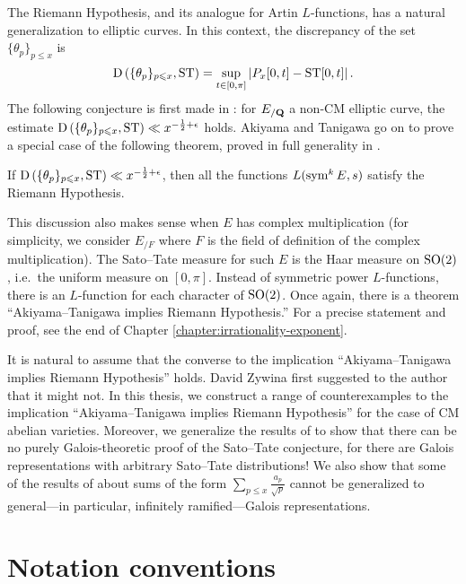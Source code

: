 The Riemann Hypothesis, and its analogue for Artin $L$-functions, has a natural 
generalization to elliptic curves. In this context, the discrepancy of the set 
$\{\theta_p\}_{p\leqslant x}$ is 
\[
	\operatorname{D}\left(\{\theta_p\}_{p\leqslant x},\mathrm{ST}\right) = \sup_{t\in [0,\pi]} \left| P_x[0,t] - \mathrm{ST}[0,t]\right| .
\]
The following conjecture is first made in \cite{akiyama-tanigawa-1999}: for 
$E_{/\mathbf{Q}}$ a non-CM elliptic curve, the estimate 
$\operatorname{D}\left(\{\theta_p\}_{p\leqslant x},\mathrm{ST}\right)\ll x^{-\frac 1 2+\epsilon}$ 
holds. Akiyama and Tanigawa go on to prove a special case of the following 
theorem, proved in full generality in \cite{mazur-2008}. 

\begin{theorem}[Mazur]
If $\operatorname{D}\left(\{\theta_p\}_{p\leqslant x},\mathrm{ST}\right)\ll x^{-\frac 1 2+\epsilon}$, 
then all the functions $L(\operatorname{sym}^k E, s)$ satisfy the Riemann Hypothesis. 
\end{theorem}

This discussion also makes sense when $E$ has complex multiplication (for 
simplicity, we consider $E_{/F}$ where $F$ is the field of definition of the 
complex multiplication). The Sato--Tate measure for such $E$ is the Haar 
measure on $\operatorname{SO}(2)$, i.e.~the uniform measure on $[0,\pi]$. Instead of 
symmetric power $L$-functions, there is an $L$-function for each character of 
$\operatorname{SO}(2)$. Once again, there is a theorem ``Akiyama--Tanigawa implies Riemann 
Hypothesis.'' For a precise statement and proof, see the end of 
Chapter \ref{chapter:irrationality-exponent}. 

It is natural to assume that the converse to the implication 
``Akiyama--Tanigawa implies Riemann Hypothesis'' holds. David Zywina 
first suggested to the author that it might not. In this thesis, we construct a 
range of counterexamples to the implication ``Akiyama--Tanigawa implies 
Riemann Hypothesis'' for the case of CM abelian varieties. Moreover, we 
generalize the results of \cite{pande-2011} to show that there can be no 
purely Galois-theoretic proof of the Sato--Tate conjecture, for there are 
Galois representations with arbitrary Sato--Tate distributions! We also show 
that some of the results of \cite{sarnak-2007} about sums of the form 
$\sum_{p\leqslant x} \frac{a_p}{\sqrt p}$ cannot be generalized to 
general---in particular, infinitely ramified---Galois representations. 





\section{Notation conventions}

